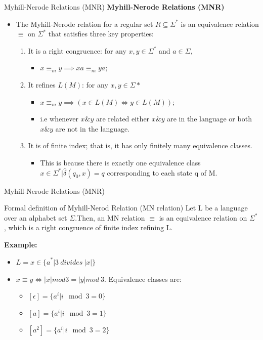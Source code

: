 \documentclass{beamer}
\begin{document}
\begin{frame}{Myhill-Nerode Relations (MNR)}
	\textbf{Myhill-Nerode Relations (MNR)}
	\begin{itemize}
		\item The Myhill-Nerode relation for a regular set $R \subseteq \Sigma^*$ is an equivalence relation $\equiv$ on $\Sigma^*$ that satisfies three key properties: 
		\begin{enumerate}
			\item  It is a right congruence: for any $x, y \in \Sigma^*$ and $a \in \Sigma $,
			\begin{itemize}
				\item 	$x \equiv_m y \implies xa \equiv_m ya;$
			\end{itemize}
			\item It refines $L(M)$: for any $x, y \in \Sigma*$
			\begin{itemize}
				\item $x \equiv_m y \implies (x \in L(M) \Leftrightarrow y \in L(M));$
				\item i.e whenever $x \& y$ are related either  $x \& y$ are in the language or both  $x \& y$ are not in the language.
			\end{itemize}
			\item It is of finite index; that is, it has only finitely many equivalence classes. 
			\begin{itemize}
				\item This is beause there is exactly one equivalence class
				${x \in \Sigma^*\big| \hat{\delta}(q_0,x)=q}$ corresponding to eaeh state q of M. 
			\end{itemize}
		\end{enumerate}
	\end{itemize}
\end{frame}
\begin{frame}{Myhill-Nerode Relations (MNR)}
	\begin{block}{Formal definition of Myhill-Nerod Relation (MN relation)}
		Let L be a language over an alphabet set $\Sigma$.Then, an MN relation $\equiv$ is an equivalence relation on $\Sigma^*$, which is a right congruence of finite index refining L.
	\end{block}
\textbf{Example:}
\begin{itemize}
	\item $L={x\in \{a}^* \big| 3\ divides\  |x|\}$
	\item $x\equiv y \Leftrightarrow |x| mod 3=|y| mod\  3$. Equivalence classes are:
	\begin{itemize}
		\item $[\epsilon]=\{a^i \big| i \mod 3 =0\}$
		\item $[a]=\{a^i \big| i \mod 3 =1\}$
			\item $[a^2]=\{a^i \big| i \mod 3 =2\}$
	\end{itemize}
\end{itemize}
\end{frame}	
\end{document}
